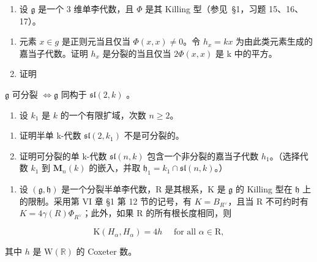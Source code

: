
\begin{enumerate}
\def\labelenumi{\arabic{enumi})}
\tightlist
\item
  设 \(\mathfrak{g}\) 是一个 3 维单李代数，且 \(\varPhi\) 是其 Killing 型（参见~§1，习题 15、16、17）。
\end{enumerate}

\begin{enumerate}
\def\labelenumi{\alph{enumi})}
\item
  元素 \(x \in g\) 是正则元当且仅当 \(\Phi(x, x) \neq 0\)。令 \(h_x = kx\) 为由此类元素生成的嘉当子代数。证明 \(h_x\) 是分裂的当且仅当 \(2\Phi(x, x)\) 是 k 中的平方。
\item
  证明
\end{enumerate}

\(\mathfrak{g}\) 可分裂 \(\Longleftrightarrow \mathfrak{g}\) 同构于 \(\mathfrak{sl}(2,k)\) 。

\begin{enumerate}
\def\labelenumi{\arabic{enumi})}
\setcounter{enumi}{1}
\tightlist
\item
  设 \(k_{1}\) 是 \(k\) 的一个有限扩域，次数 \(n \geq 2\)。
\end{enumerate}

\begin{enumerate}
\def\labelenumi{\alph{enumi})}
\item
  证明半单 k-代数 \(\mathfrak{sl}(2,k_{1})\) 不是可分裂的。
\item
  证明可分裂的单 k-代数 \(\mathfrak{sl}(n,k)\) 包含一个非分裂的嘉当子代数 \(h_{1}\)。（选择代数 \(k_{1}\) 到 \(\mathbf{M}_{n}(k)\) 的嵌入，并取 \(\mathfrak{h}_{1}=k_{1}\cap\mathfrak{sl}(n,k)\)。）
\end{enumerate}

\begin{enumerate}
\def\labelenumi{\arabic{enumi})}
\setcounter{enumi}{2}
\tightlist
\item
  设 \((\mathfrak{g},\mathfrak{h})\) 是一个分裂半单李代数，R 是其根系，K 是 \(\mathfrak{g}\) 的 Killing 型在 \(\mathfrak{h}\) 上的限制。采用第 VI 章 §1 第 12 节的记号，有 \(K = B_{R^{\vee}}\)，且当 R 不可约时有 \(K = 4\gamma(R)\varPhi_{R^{\vee}}\)；此外，如果 R 的所有根长度相同，则
\end{enumerate}

\[
\mathrm{K} (H _ {\alpha}, H _ {\alpha}) = 4 h \quad \text { for   all } \alpha \in \mathrm{R},
\]

其中 \(h\) 是 \(\mathrm{W}(\mathbb{R})\) 的 Coxeter 数。

